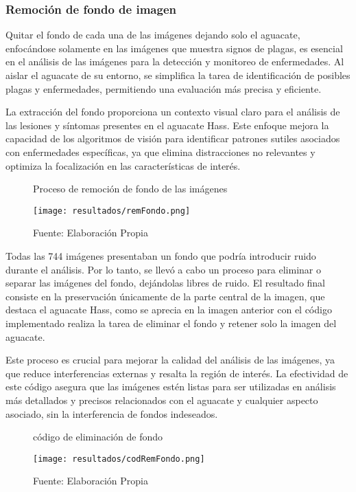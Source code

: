 \subsubsection{Remoción de fondo de imagen}

Quitar el fondo de cada una de las imágenes dejando solo el aguacate, enfocándose solamente en las imágenes que muestra signos de plagas, es esencial en el análisis de las imágenes para la detección y monitoreo de enfermedades. Al aislar el aguacate de su entorno, se simplifica la tarea de identificación de posibles plagas y enfermedades, permitiendo una evaluación más precisa y eficiente.

\newpage

La extracción del fondo proporciona un contexto visual claro para el análisis de las lesiones y síntomas presentes en el aguacate Hass. Este enfoque mejora la capacidad de los algoritmos de visión para identificar patrones sutiles asociados con enfermedades específicas, ya que elimina distracciones no relevantes y optimiza la focalización en las características de interés.

\begin{figure}[h]
\centering
\caption{Proceso de remoción de fondo de las imágenes}
\texttt{[image: resultados/remFondo.png]}
\caption*{\footnotesize Fuente: Elaboración Propia}
\label{fig:figuraRemFondo}
\end{figure}

Todas las 744 imágenes presentaban un fondo que podría introducir ruido durante el análisis. Por lo tanto, se llevó a cabo un proceso para eliminar o separar las imágenes del fondo, dejándolas libres de ruido. El resultado final consiste en la preservación únicamente de la parte central de la imagen, que destaca el aguacate Hass, como se aprecia en la imagen anterior con el código implementado realiza la tarea de eliminar el fondo y retener solo la imagen del aguacate. 

Este proceso es crucial para mejorar la calidad del análisis de las imágenes, ya que reduce interferencias externas y resalta la región de interés. La efectividad de este código asegura que las imágenes estén listas para ser utilizadas en análisis más detallados y precisos relacionados con el aguacate y cualquier aspecto asociado, sin la interferencia de fondos indeseados.


\newpage

\begin{figure}[h]
\centering
\caption{código de eliminación de fondo}
\texttt{[image: resultados/codRemFondo.png]}
\caption*{\footnotesize Fuente: Elaboración Propia}
\label{fig:figuraCodRemFondo}
\end{figure}

